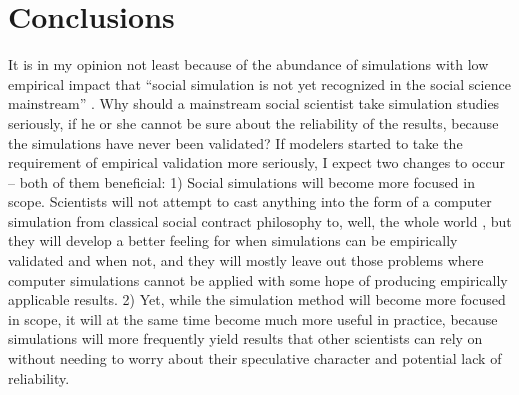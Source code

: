 \documentclass[12pt, english, a4paper]{article}
\begin{document}
\section{Conclusions}

It is in my opinion not least because of the abundance of simulations
with low empirical impact that “social simulation is not yet
recognized in the social science mainstream”
\citep[abstract]{squazzoni-casnici:2013}. Why should a mainstream
social scientist take simulation studies seriously, if he or she
cannot be sure about the reliability of the results, because the
simulations have never been validated? If modelers started to take the
requirement of empirical validation more seriously, I expect two
changes to occur – both of them beneficial: 1) Social simulations will
become more focused in scope. Scientists will not attempt to cast
anything into the form of a computer simulation from classical social
contract philosophy \citep{skyrms:1996, skyrms:2004} to, well, the
whole world \citep{futureict:2013, livingearth:2013}, but they will
develop a better feeling for when simulations can be empirically
validated and when not, and they will mostly leave out those problems
where computer simulations cannot be applied with some hope of
producing empirically applicable results. 2) Yet, while the simulation
method will become more focused in scope, it will at the same time
become much more useful in practice, because simulations will more
frequently yield results that other scientists can rely on without
needing to worry about their speculative character and potential lack
of reliability.


\singlespacing
%


\end{document}
